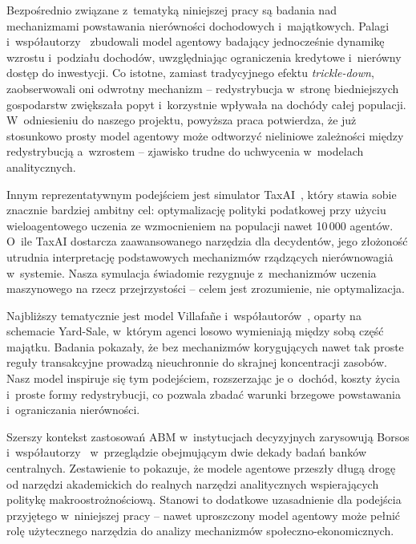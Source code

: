\documentclass[polish]{projectreport}
\begin{document}
Bezpo\'srednio zwi\k{a}zane z~tematyk\k{a} niniejszej pracy s\k{a} badania nad mechanizmami powstawania
nier\'owno\'sci dochodowych i~maj\k{a}tkowych. Palagi i~wsp\'o\l{}autorzy~\cite{palagi2023} zbudowali
model agentowy badaj\k{a}cy jednocze\'snie dynamik\k{e} wzrostu i~podzia\l{}u dochod\'ow, uwzgl\k{e}dniaj\k{a}c
ograniczenia kredytowe i~nier\'owny dost\k{e}p do inwestycji. Co istotne, zamiast tradycyjnego
efektu \emph{trickle-down}, zaobserwowali oni odwrotny mechanizm -- redystrybucja
w~stron\k{e} biedniejszych gospodarstw zwi\k{e}ksza\l{}a popyt i~korzystnie wp\l{}ywa\l{}a na doch\'ody
ca\l{}ej populacji. W~odniesieniu do naszego projektu, powy\.{z}sza praca potwierdza, \.{z}e ju\.{z}
stosunkowo prosty model agentowy mo\.{z}e odtworzy\'{c} nieliniowe zale\.{z}no\'sci mi\k{e}dzy
redystrybucj\k{a} a~wzrostem -- zjawisko trudne do uchwycenia w~modelach analitycznych.

Innym reprezentatywnym podej\'sciem jest simulator TaxAI~\cite{mi2024taxai}, kt\'ory stawia
sobie znacznie bardziej ambitny cel: optymalizacj\k{e} polityki podatkowej przy u\.{z}yciu
wieloagentowego uczenia ze wzmocnieniem na populacji nawet 10\,000 agent\'ow. O~ile
TaxAI dostarcza zaawansowanego narz\k{e}dzia dla decydent\'ow, jego z\l{}o\.{z}ono\'s\'{c}
utrudnia interpretacj\k{e} podstawowych mechanizm\'ow rz\k{a}dz\k{a}cych nierównowagi\.{a} w~systemie.
Nasza symulacja \'swiadomie rezygnuje z~mechanizm\'ow uczenia maszynowego na rzecz
przejrzysto\'sci -- celem jest zrozumienie, nie optymalizacja.

Najbli\.{z}szy tematycznie jest model Villafa\~{n}e i~wsp\'o\l{}autor\'ow~\cite{villafane2025}, oparty
na schemacie Yard-Sale, w~kt\'orym agenci losowo wymieniaj\k{a} mi\k{e}dzy sob\k{a} cz\k{e}\'s\'{c} maj\k{a}tku.
Badania pokaza\l{}y, \.{z}e bez mechanizm\'ow koryguj\k{a}cych nawet tak proste regu\l{}y transakcyjne
prowadz\k{a} nieuchronnie do skrajnej koncentracji zasob\'ow. Nasz model inspiruje si\k{e}
tym podej\'sciem, rozszerzaj\k{a}c je o~doch\'od, koszty \.{z}ycia i~proste formy redystrybucji,
co pozwala zbada\'{c} warunki brzegowe powstawania i~ograniczania nier\'owno\'sci.

Szerszy kontekst zastosowa\'n ABM w~instytucjach decyzyjnych zarysowuj\k{a} Borsos
i~wsp\'o\l{}autorzy~\cite{borsos2025} w~przegl\k{a}dzie obejmuj\k{a}cym dwie dekady bada\'n bank\'ow
centralnych. Zestawienie to pokazuje, \.{z}e modele agentowe przesz\l{}y d\l{}ug\k{a} drog\k{e} od narz\k{e}dzi
akademickich do realnych narz\k{e}dzi analitycznych wspieraj\k{a}cych polityk\k{e} makroostro\.{z}no\'sciow\k{a}.
Stanowi to dodatkowe uzasadnienie dla podej\'scia przyj\k{e}tego w~niniejszej pracy --
nawet uproszczony model agentowy mo\.{z}e pe\l{}ni\'{c} rol\k{e} u\.{z}ytecznego narz\k{e}dzia do analizy
mechanizm\'ow spo\l{}eczno-ekonomicznych.
\end{document}
